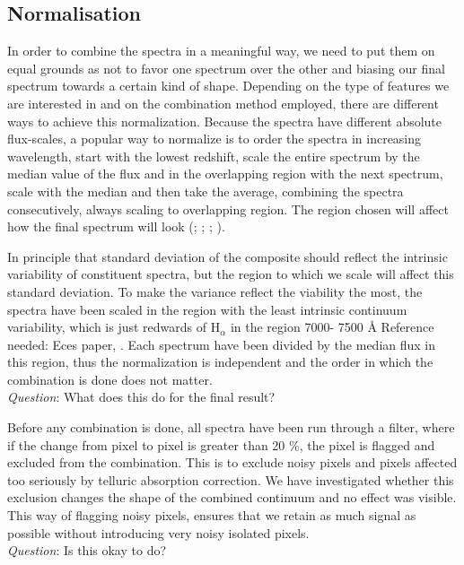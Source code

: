\documentclass{aa}    %
\newcommand{\sectlabel}[1]{\label{sect:#1}}
\newcommand{\todo}[3]{{\color{#2}\emph{#1}: #3}}
\newcommand{\qtodo}[1]{\todo{\\ Question}{red}{#1}}
\begin{document}
\subsection{Normalisation}  \sectlabel{norm}

In order to combine the spectra in a meaningful way, we need to put them on equal grounds as not to favor one spectrum over the other and biasing our final spectrum towards a certain kind of shape. Depending on the type of features we are interested in and on the combination method employed, there are different ways to achieve this normalization. Because the spectra have different absolute flux-scales, a popular way to normalize is to order the spectra in increasing wavelength, start with the lowest redshift, scale the entire spectrum by the median value of the flux and in the overlapping region with the next spectrum, scale with the median and then take the average, combining the spectra consecutively, always scaling to overlapping region. The region chosen will affect how the final spectrum will look (\cite{Francis1991}; \cite{Brotherton2000}; \cite{VandenBerk2001}; \cite{Glikman2006}).

 In principle that standard deviation of the composite should reflect the intrinsic variability of constituent spectra, but the region to which we scale will affect this standard deviation. To make the variance reflect the viability the most, the spectra have been scaled in the region with the least intrinsic continuum variability, which is just redwards of H$_\alpha$ in the region 7000- 7500 \r{A} {\color{red} Reference needed:  Eces paper, \cite{Richards2006a}}. Each spectrum have been divided by the median flux in this region, thus the normalization is independent and the order in which the combination is done does not matter. \qtodo{What does this do for the final result?}

Before any combination is done, all spectra have been run through a filter, where if the change from pixel to pixel is greater than 20 \%, the pixel is flagged and excluded from the combination. This is to exclude noisy pixels and pixels affected too seriously by telluric absorption correction. We have investigated whether this exclusion changes the shape of the combined continuum and no effect was visible. This way of flagging noisy pixels, ensures that we retain as much signal as possible without introducing very noisy isolated pixels. \qtodo{Is this okay to do?}
\end{document}
